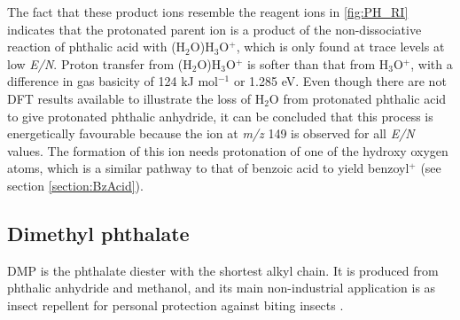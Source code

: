 The fact that these product ions resemble the reagent ions in \autoref{fig:PH_RI} indicates that the protonated parent ion is a product of the non-dissociative reaction of phthalic acid with (H$_2$O)H$_3$O$^+$, which is only found at trace levels at low \textit{E/N}.
%
Proton transfer from (H$_2$O)H$_3$O$^+$ is  softer  than that from H$_3$O$^+$, with a difference in gas basicity  of 124 kJ mol$^{-1}$ or 1.285 eV.
%
Even though there are not DFT results available to illustrate the loss of H$_2$O from protonated phthalic acid to give protonated phthalic anhydride, it can be concluded that this process is energetically favourable because the ion at \textit{m/z} 149 is observed for all \textit{E/N} values. 
%
The formation of this ion needs  protonation of one of the hydroxy oxygen atoms, which is a similar pathway to that of benzoic acid to yield benzoyl$^+$ (see section \ref{section:BzAcid}). %




















\subsection{Dimethyl phthalate}
DMP is the phthalate diester with the shortest alkyl chain. It is produced from phthalic anhydride and methanol, and  its main non-industrial application is as insect repellent for personal protection against biting insects  \cite{lowenheim1975industrial,o2013merck,brown1997insect}.


